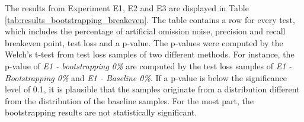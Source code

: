The results from Experiment E1, E2 and E3 are displayed in Table \ref{tab:results_bootstrapping_breakeven}. The table contains a row for every test, which includes  the percentage of artificial omission noise, precision and recall breakeven point, test loss and a p-value. The p-values were computed by the Welch's t-test from test loss samples of two different methods. For instance, the p-value of {\it E1 - bootstrapping 0\%} are computed by the test loss samples of {\it E1 - Bootstrapping 0\%} and {\it E1 - Baseline 0\%}.  If a p-value is below the significance level of 0.1, it is plausible that the samples originate from a distribution different from the distribution of the baseline samples. For the most part, the bootstrapping results are not statistically significant.\\



